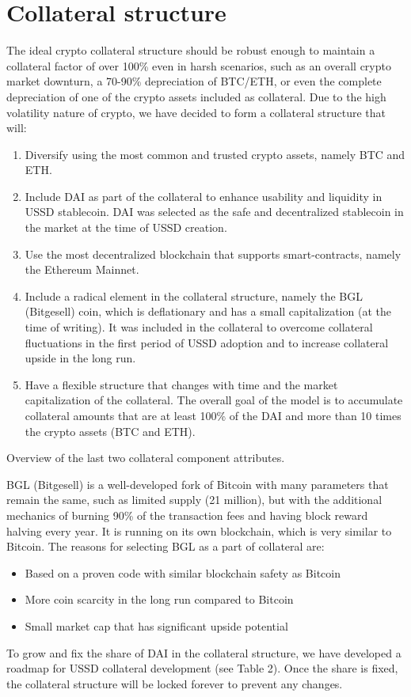 
\section{Collateral structure}

The ideal crypto collateral structure should be robust enough to maintain a collateral factor 
of over 100\% even in harsh scenarios, such as an overall crypto market downturn, a 70-90\% 
depreciation of BTC/ETH, or even the complete depreciation of one of the crypto assets included 
as collateral. Due to the high volatility nature of crypto, we have decided to form a collateral 
structure that will:

\begin{enumerate}
  \item Diversify using the most common and trusted crypto assets, namely BTC and ETH.
  \item Include DAI as part of the collateral to enhance usability and liquidity in USSD stablecoin. 
  DAI was selected as the safe and decentralized stablecoin in the market at the time of USSD creation.
  \item Use the most decentralized blockchain that supports smart-contracts, namely the Ethereum Mainnet.
  \item Include a radical element in the collateral structure, namely the BGL (Bitgesell) coin, 
  which is deflationary and has a small capitalization (at the time of writing). It was included 
  in the collateral to overcome collateral fluctuations in the first period of USSD adoption and 
  to increase collateral upside in the long run.
  \item Have a flexible structure that changes with time and the market capitalization of the 
  collateral. The overall goal of the model is to accumulate collateral amounts that are at least 100\% 
  of the DAI and more than 10 times the crypto assets (BTC and ETH).
\end{enumerate}

Overview of the last two collateral component attributes.

BGL (Bitgesell) is a well-developed fork of Bitcoin with many parameters that 
remain the same, such as limited supply (21 million), but with the additional 
mechanics of burning 90\% of the transaction fees and having block reward halving 
every year. It is running on its own blockchain, which is very similar to Bitcoin. 
The reasons for selecting BGL as a part of collateral are:
\begin{itemize}
  \item Based on a proven code with similar blockchain safety as Bitcoin
  \item More coin scarcity in the long run compared to Bitcoin
  \item Small market cap that has significant upside potential
\end{itemize}
To grow and fix the share of DAI in the collateral structure, we have developed a roadmap 
for USSD collateral development (see Table 2). Once the share is fixed, the collateral structure 
will be locked forever to prevent any changes.


